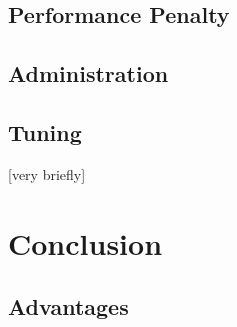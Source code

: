 \documentclass[titlepage, a4paper, 11pt]{scrartcl}
\begin{document}


        \subsection{Performance Penalty}\label{analysis:penalty}



        \subsection{Administration}\label{analysis:administration}

        


        \subsection{Tuning}\label{analysis:tuning}

        [very briefly]


    \section{Conclusion}

        \subsection{Advantages}

\end{document}
